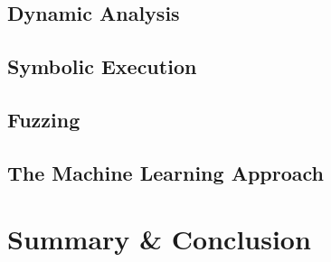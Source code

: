 \documentclass[a4paper,11pt]{article}
\begin{document}
\subsection{Dynamic Analysis}

\subsection{Symbolic Execution}

\subsection{Fuzzing}

\subsection{The Machine Learning Approach}

\section{Summary \& Conclusion}

\nocite{*}



\small

\end{document}
